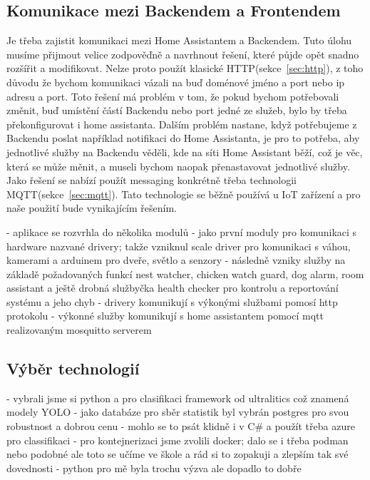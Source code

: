 \subsection{Komunikace mezi Backendem a Frontendem}
Je třeba zajistit komunikaci mezi Home Assistantem a Backendem.
Tuto úlohu musíme přijmout velice zodpověďně a navrhnout řešení, které půjde opět snadno rozšířit a modifikovat.
Nelze proto použít klasické HTTP(sekce~\ref{sec:http}), z toho důvodu že bychom komunikaci vázali na buď doménové jméno a port nebo ip adresu a port.
Toto řešení má problém v tom, že pokud bychom potřebovali změnit, buď umístění částí Backendu nebo port jedné ze služeb, bylo by třeba překonfigurovat i home assistanta.
Dalším problém nastane, když potřebujeme z Backendu poslat například notifikaci do Home Assistanta, je pro to potřeba, aby jednotlivé služby na Backendu věděli, kde na síti Home Assistant běží, což je věc, která se může měnit, a museli bychom naopak přenastavovat jednotlivé služby.
Jako řešení se nabízí použít messaging konkrétně třeba technologii MQTT(sekce~\ref{sec:mqtt}).
Tato technologie se běžně používá u IoT zařízení a pro naše použití bude vynikajícím řešením.


- aplikace se rozvrhla do několika modulů\newline
- jako první moduly pro komunikaci s hardware nazvané drivery; takže vzniknul scale driver pro komunikaci s váhou, kamerami a arduinem pro dveře, světlo a senzory\newline
- následně vzniky služby na základě požadovaných funkcí nest watcher, chicken watch guard, dog alarm, room assistant a ještě drobná službyčka health checker pro kontrolu a reportování systému a jeho chyb\newline
- drivery komunikují s výkonými službami pomosí http protokolu \newline
- výkonné služby komunikují s home assistantem pomocí mqtt realizovaným mosquitto serverem

\subsection{Výběr technologií}
- vybrali jsme si python a pro clasifikaci framework od ultralitics což znamená modely YOLO\newline
- jako databáze pro sběr statistik byl vybrán postgres pro svou robustnost a dobrou cenu\newline
- mohlo se to psát klidně i v C\# a použít třeba azure pro classifikaci\newline
- pro kontejnerizaci jsme zvolili docker; dalo se i třeba podman nebo podobné ale toto se učíme ve škole a rád si to zopakuji a zlepším tak své dovednosti\newline
- python pro mě byla trochu výzva ale dopadlo to dobře


